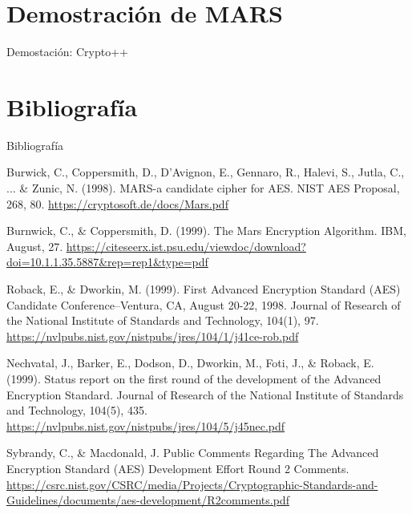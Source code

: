 \documentclass{beamer}
\begin{document}
\section{Demostración de MARS}
\begin{frame}{Demostación: Crypto++}



\end{frame}


\section{Bibliografía}
\begin{frame}[allowframebreaks]{Bibliografía}

\scriptsize
\begin{thebibliography}{9}


	Burwick, C., Coppersmith, D., D’Avignon, E., Gennaro, R., Halevi, S., Jutla, C., ... \& Zunic, N. (1998). MARS-a candidate cipher for AES. NIST AES Proposal, 268, 80. \url{https://cryptosoft.de/docs/Mars.pdf}


	Burnwick, C., \& Coppersmith, D. (1999). The Mars Encryption Algorithm. IBM, August, 27. \url{https://citeseerx.ist.psu.edu/viewdoc/download?doi=10.1.1.35.5887&rep=rep1&type=pdf}



	Roback, E., \& Dworkin, M. (1999). First Advanced Encryption Standard (AES) Candidate Conference--Ventura, CA, August 20-22, 1998. Journal of Research of the National Institute of Standards and Technology, 104(1), 97. \url{https://nvlpubs.nist.gov/nistpubs/jres/104/1/j41ce-rob.pdf}


	Nechvatal, J., Barker, E., Dodson, D., Dworkin, M., Foti, J., \& Roback, E. (1999). Status report on the first round of the development of the Advanced Encryption Standard. Journal of Research of the National Institute of Standards and Technology, 104(5), 435. \url{https://nvlpubs.nist.gov/nistpubs/jres/104/5/j45nec.pdf}

	Sybrandy, C., \& Macdonald, J. Public Comments Regarding The Advanced Encryption Standard (AES) Development Effort Round 2 Comments.	\url{https://csrc.nist.gov/CSRC/media/Projects/Cryptographic-Standards-and-Guidelines/documents/aes-development/R2comments.pdf}


\end{thebibliography}
\end{frame}
\end{document}
